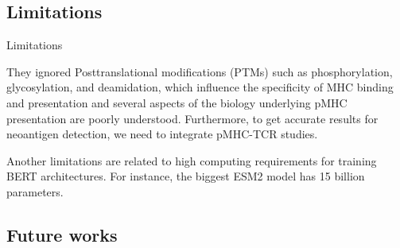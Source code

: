 \documentclass[10pt]{beamer}
\newcommand{\1}{
	\setbeamertemplate{background}{
		\texttt{[image: ../img/1]}
		\tikz[overlay] \fill[fill opacity=0.75,fill=white] (0,0) rectangle (-\paperwidth,\paperheight);
	}
}
\begin{document}
	

	
	\subsection{Limitations }
	
	\begin{frame}{Limitations}{}
		
		\begin{block}{}
			They ignored Posttranslational modifications (PTMs) such as phosphorylation, glycosylation, and deamidation, which influence the specificity of MHC binding and presentation and several aspects of the biology underlying pMHC presentation are poorly understood. Furthermore, to get accurate results for neoantigen detection, we need to integrate pMHC-TCR studies. 
		\end{block}
		
		\begin{block}{}
			Another limitations are related to high computing requirements for training BERT architectures. For instance, the biggest ESM2 model has 15 billion parameters.
		\end{block}
		
	\end{frame}
	
	\subsection{Future works }
	
\end{document}
